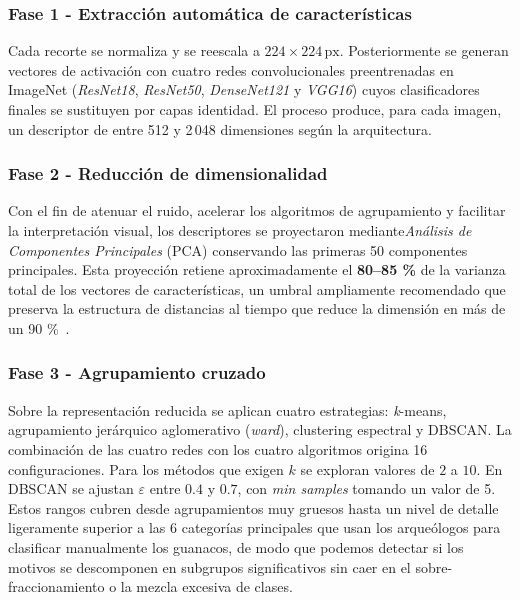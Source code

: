 \subsubsection*{Fase 1 - Extracción automática de características}

Cada recorte se normaliza y se reescala a \(224\times224\,\text{px}\).
Posteriormente se generan vectores de activación con cuatro redes convolucionales preentrenadas en ImageNet (\emph{ResNet18}, \emph{ResNet50}, \emph{DenseNet121} y \emph{VGG16}) cuyos clasificadores finales se sustituyen por capas identidad.
El proceso produce, para cada imagen, un descriptor de entre 512 y 2\,048 dimensiones según la arquitectura.

\subsubsection*{Fase 2 - Reducción de dimensionalidad}

Con el fin de atenuar el ruido, acelerar los algoritmos de agrupamiento y facilitar la interpretación visual, los descriptores se proyectaron mediante\emph{Análisis de Componentes Principales} (PCA) conservando las primeras 50 componentes principales.
Esta proyección retiene aproximadamente el \textbf{80–85 \%} de la varianza total de los vectores de características, un umbral ampliamente recomendado que preserva la estructura de distancias al tiempo que reduce la dimensión en más de un 90 \%~\cite{jolliffe2016principal}.

\subsubsection*{Fase 3 - Agrupamiento cruzado}

Sobre la representación reducida se aplican cuatro estrategias: \emph{k}-means, agrupamiento jerárquico aglomerativo (\emph{ward}), clustering espectral y DBSCAN.
La combinación de las cuatro redes con los cuatro algoritmos origina 16 configuraciones.
Para los métodos que exigen \(k\) se exploran valores de \(2\) a \(10\). En DBSCAN se ajustan \(\varepsilon\) entre \(0.4\) y \(0.7\), con \textit{min samples} tomando un valor de 5.
Estos rangos cubren desde agrupamientos muy gruesos hasta un nivel de detalle ligeramente superior a las 6 categorías principales que usan los arqueólogos para clasificar manualmente los guanacos, de modo que podemos detectar si los motivos se descomponen en subgrupos significativos sin caer en el sobre-fraccionamiento o la mezcla excesiva de clases.

